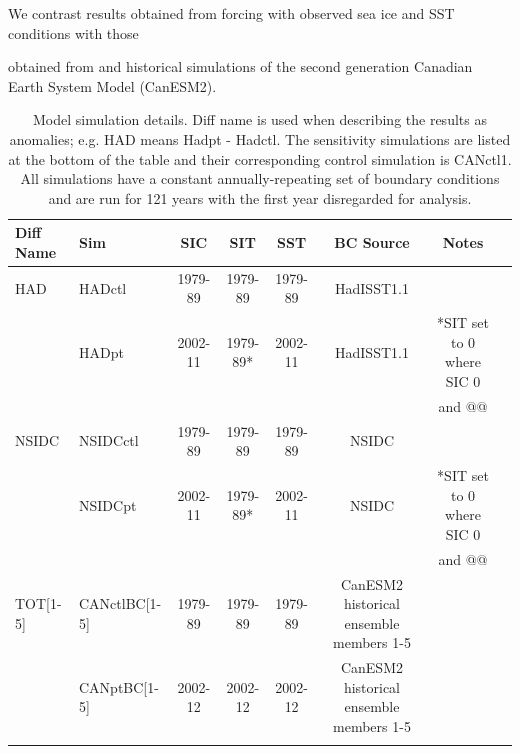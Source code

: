 \documentclass[twocol]{ametsoc}
\begin{document}
 We contrast results obtained from forcing with observed sea ice and SST conditions with those 

 obtained from  and historical simulations of the second generation Canadian Earth System Model (CanESM2).


\begin{table}[t]
\caption{Model simulation details. Diff name is used when describing the results as anomalies; e.g. HAD means Hadpt - Hadctl. The sensitivity simulations are listed at the bottom of the table and their corresponding control simulation is CANctl1. All simulations have a constant annually-repeating set of boundary conditions and are run for 121 years with the first year disregarded for analysis.}\label{simstbl}
\begin{center}
\begin{tabular}{llcccccc}
\hline\hline
Diff Name & Sim & SIC & SIT & SST & BC Source & Notes\\
\hline
HAD &  HADctl   & 1979-89 & 1979-89 & 1979-89 & HadISST1.1 \\
         & HADpt &   2002-11 & 1979-89* & 2002-11 & HadISST1.1 & *SIT set to 0 where SIC 0 \\
            &                 &               &                &                &                     &     and @@\\
 NSIDC & NSIDCctl  &1979-89 & 1979-89 & 1979-89 & NSIDC \\
             & NSIDCpt &   2002-11 & 1979-89* & 2002-11 & NSIDC & *SIT set to 0 where SIC 0 \\
               &              &                &                 &               &              &   and @@\\
 TOT[1-5] & CANctlBC[1-5] & 1979-89 & 1979-89 & 1979-89  & CanESM2 historical ensemble members 1-5  & \\
                & CANptBC[1-5] &   2002-12 & 2002-12 & 2002-12 &  CanESM2 historical ensemble members 1-5  & \\
 \\

\end{tabular}
\end{center}
\end{table}
\end{document}
